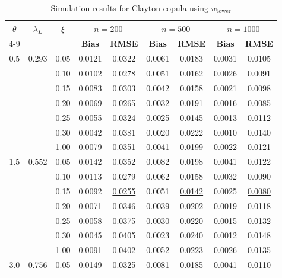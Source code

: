 \documentclass[twoside]{article}
\begin{document}
\begin{table}[!t]
\centering
\small
\setlength{\tabcolsep}{4pt}
\caption{Simulation results for Clayton copula using $w_{\text{lower}}$}
\label{tab:clayton}
\begin{tabular}{c c c @{\hspace{1.5em}} c c @{\hspace{1.5em}} c c @{\hspace{1.5em}} c c}
\hline
\multicolumn{1}{c}{\textbf{$\theta$}} & \multicolumn{1}{c}{\textbf{$\lambda_L$}} & \multicolumn{1}{c}{\textbf{$\xi$}} & \multicolumn{2}{c}{\textbf{$n=200$}} & \multicolumn{2}{c}{\textbf{$n=500$}} & \multicolumn{2}{c}{\textbf{$n=1000$}} \\
\cline{4-9}
 & & & \textbf{Bias} & \textbf{RMSE} & \textbf{Bias} & \textbf{RMSE} & \textbf{Bias} & \textbf{RMSE} \\
\hline
0.5 & 0.293 & 0.05 & 0.0121 & 0.0322 & 0.0061 & 0.0183 & 0.0031 & 0.0105 \\
 & & 0.10 & 0.0102 & 0.0278 & 0.0051 & 0.0162 & 0.0026 & 0.0091 \\
 & & 0.15 & 0.0083 & 0.0303 & 0.0042 & 0.0158 & 0.0021 & 0.0098 \\
 & & 0.20 & 0.0069 & \underline{0.0265} & 0.0032 & 0.0191 & 0.0016 & \underline{0.0085} \\
 & & 0.25 & 0.0055 & 0.0324 & 0.0025 & \underline{0.0145} & 0.0013 & 0.0112 \\
 & & 0.30 & 0.0042 & 0.0381 & 0.0020 & 0.0222 & 0.0010 & 0.0140 \\
 & & 1.00 & 0.0079 & 0.0351 & 0.0041 & 0.0199 & 0.0022 & 0.0121 \\
\hline
1.5 & 0.552 & 0.05 & 0.0142 & 0.0352 & 0.0082 & 0.0198 & 0.0041 & 0.0122 \\
 & & 0.10 & 0.0113 & 0.0279 & 0.0062 & 0.0158 & 0.0032 & 0.0090 \\
 & & 0.15 & 0.0092 & \underline{0.0255} & 0.0051 & \underline{0.0142} & 0.0025 & \underline{0.0080} \\
 & & 0.20 & 0.0071 & 0.0346 & 0.0039 & 0.0202 & 0.0019 & 0.0118 \\
 & & 0.25 & 0.0058 & 0.0375 & 0.0030 & 0.0220 & 0.0015 & 0.0132 \\
 & & 0.30 & 0.0045 & 0.0405 & 0.0023 & 0.0240 & 0.0012 & 0.0148 \\
 & & 1.00 & 0.0091 & 0.0402 & 0.0052 & 0.0223 & 0.0026 & 0.0135 \\
\hline
3.0 & 0.756 & 0.05 & 0.0149 & 0.0325 & 0.0081 & 0.0185 & 0.0041 & 0.0110 \\

\end{tabular}
\end{table}
\end{document}

